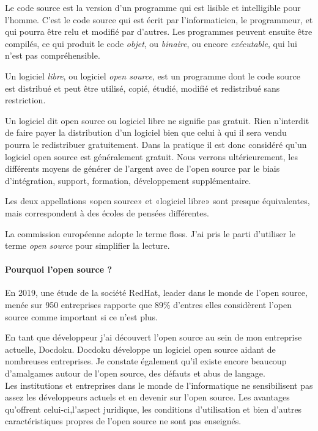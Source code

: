 			Le code source est la version d'un programme qui est lisible et intelligible pour l'homme. C'est le code source qui est écrit par l'informaticien, le programmeur, et qui pourra être relu et modifié par d'autres. Les programmes peuvent ensuite être compilés, ce qui produit le code \textit{objet}, ou \textit{binaire}, ou encore \textit{exécutable}, qui lui n'est pas compréhensible.

			Un logiciel \textit{libre}, ou logiciel \textit{open source}, est un programme dont le code source est distribué et peut être utilisé, copié, étudié, modifié et redistribué sans restriction.

			Un logiciel dit open source ou logiciel libre ne signifie pas gratuit.
			Rien n'interdit de faire payer la distribution d'un logiciel bien que celui à qui il sera vendu pourra le redistribuer gratuitement.
			Dans la pratique il est donc considéré qu'un logiciel open source est généralement gratuit. Nous verrons ultérieurement, les différents moyens de générer de l'argent avec de l'open source par le biais d'intégration, support, formation, développement supplémentaire.

			Les deux appellations «open source» et «logiciel libre» sont presque équivalentes, mais correspondent à des écoles de pensées différentes.

			La commission européenne adopte le terme \acrfull{floss}. J'ai pris le parti d'utiliser le terme \textit{open source} pour simplifier la lecture.
				
		\paragraph{Pourquoi l'open source ?\\}

			En 2019, une étude de la société RedHat, leader dans le monde de l'open source, menée sur 950 entreprises rapporte que 89\% d'entres elles  considèrent l'open source comme important si ce n'est plus.

			En tant que développeur j'ai découvert l'open source au sein de mon entreprise actuelle, Docdoku.
			Docdoku développe un logiciel open source aidant de nombreuses entreprises.
			Je constate également qu'il existe encore beaucoup d'amalgames autour de l'open source, des défauts et abus de langage.\\
			Les institutions et entreprises dans le monde de l'informatique ne sensibilisent pas assez les développeurs actuels et en devenir sur l'open source. Les avantages qu'offrent celui-ci,l'aspect juridique, les conditions d'utilisation et bien d'autres caractéristiques propres de l'open source ne sont pas enseignés.\\

